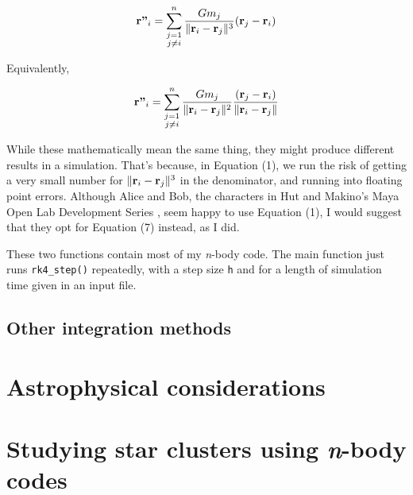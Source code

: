 \documentclass{article}
\DeclarePairedDelimiter{\norm}{\lVert}{\rVert}
\begin{document}
\begin{equation*}
    \textbf{r''}_i = \sum_{\substack{j=1\\j\neq i}}^n \frac{Gm_j}{\norm{\textbf{r}_i-\textbf{r}_j}^3}(\textbf{r}_j-\textbf{r}_i)
\end{equation*}

Equivalently,

\begin{equation}
    \textbf{r''}_i = \sum_{\substack{j=1\\j\neq i}}^n \frac{Gm_j}{\norm{\textbf{r}_i-\textbf{r}_j}^2}\frac{(\textbf{r}_j-\textbf{r}_i)}{\norm{\textbf{r}_i-\textbf{r}_j}}
\end{equation}

While these mathematically mean the same thing, they might produce different results in a simulation. That's because, in Equation (1), we run the risk of getting a very small number for $\norm{\textbf{r}_i-\textbf{r}_j}^3$ in the denominator, and running into floating point errors. Although Alice and Bob, the characters in Hut and Makino's Maya Open Lab Development Series \cite{hut2007art}, seem happy to use Equation (1), I would suggest that they opt for Equation (7) instead, as I did.

These two functions contain most of my \textit{n}-body code. The main function just runs \colorbox{g}{\lstinline[basicstyle=\ttfamily\footnotesize\color{black}]|rk4_step()|} repeatedly, with a step size \colorbox{g}{\lstinline[basicstyle=\ttfamily\footnotesize\color{black}]|h|} and for a length of simulation time given in an input file.


\subsection{Other integration methods}


\section{Astrophysical considerations}

\section{Studying star clusters using \textit{n}-body codes}





\end{document}
